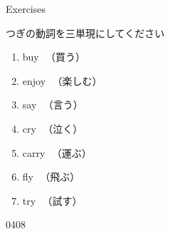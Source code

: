 \documentclass[aspectratio=169,xcolor={dvipsnames,table}]{beamer}
\newcommand{\myaudio}[1]{\href{#1}{\faVolumeUp}}
\begin{document}
\begin{frame}[plain]{Exercises}
 
つぎの動詞を三単現にしてください

\Large
\begin{enumerate}
 \item buy\,\,\,\,{\small {}（買う）}\hfill{}\hspace{200pt}\mbox{}
 \item enjoy\,\,\,\,{\small {}（楽しむ）}\hfill{}\hspace{200pt}\mbox{}
 \item say\,\,\,\,{\small {}（言う）}\hfill{}\,\,\,\hspace{160pt}\mbox{}
 \item cry\,\,\,\,{\small {}（泣く）}\hfill{}\hspace{200pt}\mbox{}
 \item carry\,\,\,\,{\small {}（運ぶ）}\hfill{}\hspace{200pt}\mbox{}
 \item fly\,\,\,\,{\small {}（飛ぶ）}\hfill{}\hspace{200pt}\mbox{}
 \item try\,\,\,\,{\small {}（試す）}\hfill{}\hspace{200pt}\mbox{}
\end{enumerate}

\hfill{\tiny 0408}\,{\scriptsize \myaudio{./audio/005_singular_plural_d.mp3}}


\end{frame}
\end{document}
